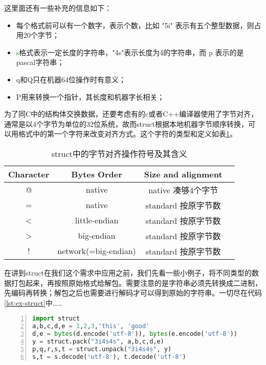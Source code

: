 这里面还有一些补充的信息如下：
\begin{itemize}
  \item 每个格式前可以有一个数字，表示个数，比如 "5i" 表示有五个整型数据，则占用20个字节；
  \item \textcolor{green}{s}格式表示一定长度的字符串，"4s"表示长度为4的字符串，而 p 表示的是pascal字符串；
  \item q和Q只在机器64位操作时有意义；
  \item P用来转换一个指针，其长度和机器字长相关；
\end{itemize}

为了同C中的结构体交换数据，还要考虑有的c或者C++编译器使用了字节对齐，通常是以4个字节为单位的32位系统，故而struct根据本地机器字节顺序转换，可以用格式中的第一个字符来改变对齐方式。这个字符的类型和定义如表\ref{tab:align-struct}。
\begin{table}[h]
 \centering
 \caption{struct中的字节对齐操作符号及其含义}
   \begin{tabular*}{1\textwidth}{@{\extracolsep{\fill}}cccc}
   \toprule
   Character       &Bytes Order               &Size and alignment           \\
   \midrule
   @               &native                    &native 凑够4个字节            \\
   =               &native                    &standard 按原字节数            \\
   <               &little-endian             &standard 按原字节数            \\
   >               &big-endian                &standard 按原字节数            \\
   !               &network(=big-endian)      &standard 按原字节数             \\
   \bottomrule
   \end{tabular*}%
 \label{tab:align-struct}%
\end{table}%

在讲到struct在我们这个需求中应用之前，我们先看一些小例子，将不同类型的数据打包起来，再按照原始格式给解包。需要注意的是字符串必须先转换成二进制，先编码再转换；解包之后也需要进行解码才可以得到原始的字符串。一切尽在代码\ref{lst:ex-struct}中……
\begin{lstlisting}[language = python, caption={struct打包和解包不同类型的数据}, label={lst:ex-struct}, numbers=left, 
       numberstyle=\tiny,keywordstyle=\color{blue!70},
       commentstyle=\color{red!50!green!50!blue!50},frame=shadowbox,
       rulesepcolor=\color{red!20!green!20!blue!20},basicstyle=\ttfamily]
import struct
a,b,c,d,e = 1,2,3,'this', 'good'
d,e = bytes(d.encode('utf-8')), bytes(e.encode('utf-8'))
y = struct.pack("3i4s4s", a,b,c,d,e)
p,q,r,s,t = struct.unpack("3i4s4s", y)
s,t = s.decode('utf-8'), t.decode('utf-8')
\end{lstlisting}

